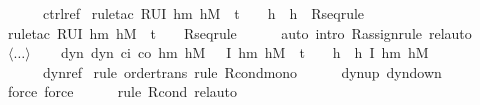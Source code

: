 \documentclass[envcountsame,envcountsect]{llncs}
\begin{document}
\begin{example}
\begin{isabellebody}
\ \ {\isacharparenleft}\ {\isachardoublequoteopen}{\isacharunderscore}\ {\isasymle}\ {\isacharquery}ctrl{\isacharunderscore}ref{\isachardoublequoteclose}{\isacharparenright}\ \isamarkupfalse%
{\isacharparenleft}rule{\isacharunderscore}tac\ R{\isacharequal}{\isachardoublequoteopen}U{\isacharparenleft}I\ h\isactrlsub m\ h\isactrlsub M\ {\isasymand}\ t\ {\isacharequal}\ {}\ {\isasymand}\ h\ {\isacharequal}\ h{\isacharparenright}{\isachardoublequoteclose}\ \ R{\isacharunderscore}seq{\isacharunderscore}rule{\isacharparenright}\isanewline
\ \ \ \ \ \isamarkupfalse%
{\isacharparenleft}rule{\isacharunderscore}tac\ R{\isacharequal}{\isachardoublequoteopen}U{\isacharparenleft}I\ h\isactrlsub m\ h\isactrlsub M\ {\isasymand}\ t\ {\isacharequal}\ {}{\isacharparenright}{\isachardoublequoteclose}\ \ R{\isacharunderscore}seq{\isacharunderscore}rule{\isacharparenright}\isanewline
\ \ \ \ \isamarkupfalse%
\ {\isacharparenleft}auto\ intro{\isacharbang}{\isacharcolon}\ R{\isacharunderscore}assign{\isacharunderscore}rule{\isacharcomma}\ rel{\isacharunderscore}auto{\isacharprime}{\isacharparenright}\isanewline
\ \ %
\ $\langle\dots\rangle$\isanewline
\ \ \isamarkupfalse%
\ dyn{\isacharcolon}\ {\isachardoublequoteopen}dyn\ c\isactrlsub i\ c\isactrlsub o\ h\isactrlsub m\ h\isactrlsub M\ {\isasymtau}\ {\isasymle}\ \isactrlbold {\isacharbrackleft}I\ h\isactrlsub m\ h\isactrlsub M\ {\isasymand}\ t\ {\isacharequal}\ {}\ {\isasymand}\ h\ {\isacharequal}\ h{\isacharcomma}\ I\ h\isactrlsub m\ h\isactrlsub M\isactrlbold {\isacharbrackright}{\isachardoublequoteclose}\isanewline 
\ \ {\isacharparenleft}\ {\isachardoublequoteopen}{\isacharunderscore}\ {\isasymle}\ {\isacharquery}dyn{\isacharunderscore}ref{\isachardoublequoteclose}{\isacharparenright}\ \isamarkupfalse%
{\isacharparenleft}rule\ order{\isacharunderscore}trans{\isacharcomma}\ rule\ R{\isacharunderscore}cond{\isacharunderscore}mono{\isacharparenright}\isanewline
\ \ \ \ \isamarkupfalse%
\ dynup\ dyndown\ \isamarkupfalse%
{\isacharparenleft}force{\isacharcomma}\ force{\isacharparenright}\isanewline
\ \ \ \ \isamarkupfalse%
\ {\isacharparenleft}rule\ R{\isacharunderscore}cond{\isacharcomma}\ rel{\isacharunderscore}auto{\isacharprime}{\isacharparenright}\isanewline
\ \ %
\isanewline

\end{isabellebody}
\end{example}
\end{document}
